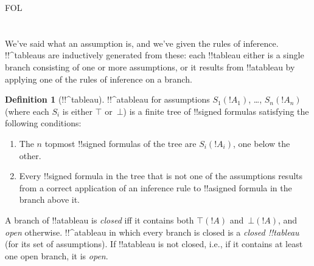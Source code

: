 \documentclass[10pt,a4paper]{article}
\theoremstyle{plain}
\theoremstyle{definition}
\newtheorem{defn}[thm]{Definition}
\theoremstyle{remark}
\newenvironment{explain}{}{}
\newcommand*{\olfileid}[3]{}
\newcommand*{\olsection}[1]{\section*{#1}}
\providecommand{\sFmla}[2]{#1(#2)}
\providecommand{\True}{\top}
\providecommand{\False}{\bot}
\providecommand{\iftag}[1]{#1}
\begin{document}



\iftag{FOL}
      {\olfileid{fol}{tab}{der}}
      {\olfileid{pl}{tab}{der}}

\olsection{}

\begin{explain}
We've said what an assumption is, and we've given the rules of
inference.  !!^{tableau}s are inductively generated from these: each
!!{tableau} either is a single branch consisting of one or more
assumptions, or it results from !!a{tableau} by applying one of the
rules of inference on a branch.
\end{explain}

\begin{defn}[!!^{tableau}]
!!^a{tableau} for assumptions $\sFmla{S_1}{!A_1}$, \dots,
$\sFmla{S_n}{!A_n}$ (where each $S_i$ is either $\True$ or~$\False$) is
a finite tree of !!{signed formula}s satisfying the following conditions:
\begin{enumerate}
\item The $n$ topmost !!{signed formula}s of the tree are
  $\sFmla{S_i}{!A_i}$, one below the other.
\item Every !!{signed formula} in the tree that is not one of the
  assumptions results from a correct application of an inference rule
  to !!a{signed formula} in the branch above it.
\end{enumerate}
A branch of !!a{tableau} is \emph{closed} iff it contains both
$\sFmla{\True}{!A}$ and~$\sFmla{\False}{!A}$, and \emph{open}
otherwise. !!^a{tableau} in which every branch is closed is a
\emph{closed !!{tableau}} (for its set of assumptions). If !!a{tableau} is
not closed, i.e., if it contains at least one open branch, it is
\emph{open}.
\end{defn}
\end{document}
